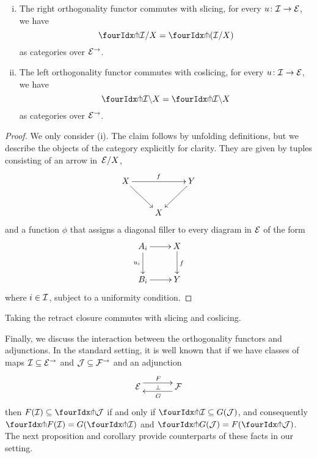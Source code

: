 \documentclass[reqno,10pt,a4paper,oneside]{amsart}
\begin{document}
\begin{proposition} \hfill 
\label{pitchfork-slicing}
\begin{enumerate}[(i)]
\item The right orthogonality functor commutes with slicing, \ie for every $u \co \cal{I} \to \cal{E}$, we have
\[
  \liftr{\cal{I}}/X = \liftr{(\cal{I}/X)}
\]
as categories over $\cal{E}^\to$.
\item The left orthogonality functor commutes with coslicing, \ie for every $u \co \cal{I} \to \cal{E}$, we have
\[
 \liftl{\cal{I}} \backslash X = \liftl{\cal{I} \backslash X}
\]
as categories over $\cal{E}^\to$.
\end{enumerate}
\end{proposition}

\begin{proof} We only consider (i). The claim follows by unfolding definitions, but we describe the objects of the category explicitly for clarity. They are given by 
tuples consisting of an arrow in~$\cal{E}/X$, 
\[
\xymatrix{
X \ar[dr] \ar[rr]^f  &  & Y \ar[dl] \\
 & X & }
 \]
and a function $\phi$ that assigns a diagonal filler to every diagram in $\cal{E}$ of the form
\[
\xymatrix{
A_i \ar[r] \ar[d]_{u_i} & X \ar[d]^{f} \\
B_i \ar[r] & Y}
\]
where $i \in \cal{I}$, subject to a uniformity condition. 
\end{proof}

\begin{remark}
\label{retract-closure-slicing}
Taking the retract closure commutes with slicing and coslicing.
\end{remark}

Finally, we discuss the interaction between the orthogonality functors and adjunctions.
In the standard setting, it is well known that if  we have classes of maps $\cal{I} \subseteq \cal{E}^\to$ and $\cal{J} \subseteq \cal{F}^\to$ and an adjunction
\[
\xymatrix@C+1em{
  \cal{E}
  \ar@<5pt>[r]^{F}
  \ar@{}[r]|{\bot}
&
  \cal{F}
  \ar@<5pt>[l]^{G}
}
\]
then $F(\cal{I}) \subseteq \liftl{\cal{J}}$ if and only if $\liftr{\cal{I}} \subseteq G(\cal{J})$, and consequently $\liftr{F(\cal{I})} = G(\liftr{\cal{I}})$ and $\liftl{G(\cal{J})} = F(\liftl{\cal{J}})$.
The next proposition and corollary provide counterparts of these facts in our setting.
\end{document}
